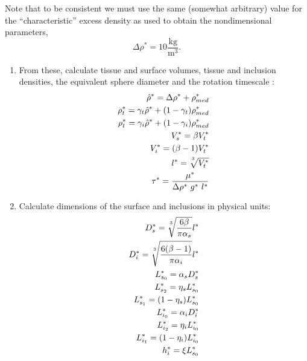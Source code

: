 \documentclass[10pt,a4paper]{article}
\def\non{\nonumber}
\def\l{\mathit{l}}
\begin{document}
\color{red}
Note that to be consistent we must use the same (somewhat arbitrary) value for the ``characteristic'' excess density as used to obtain the nondimensional parameters,
\begin{equation}
	\Delta \rho^* = 10 \frac{\mathrm{kg}}{\mathrm{m^3}}.
\end{equation}
\color{black}


\begin{enumerate}
	\item From these, calculate tissue and surface volumes, tissue and inclusion densities, the equivalent sphere diameter and the rotation timescale :
\begin{eqnarray}\label{nd2dpars3}
	\hat{\rho}^* = \Delta \rho^* + \rho^*_{med} \non \\
	\rho^*_t = \gamma_t \hat{\rho}^* + (1-\gamma_t) \rho^*_{med} \non \\
	\rho^*_t = \gamma_i \hat{\rho}^* + (1-\gamma_i) \rho^*_{med} \non \\
	V_s^* = \beta V_t^* \non \\
	V_i^* = (\beta-1) V_t^* \non \\
	l^* = \sqrt[\uproot{5}3]{V_t^*} \non \\
	\tau^* = \frac{\mu^*}{\Delta \rho^* ~ g^* ~ l^*}
\end{eqnarray}
\item Calculate dimensions of the surface and inclusions in physical units:
\begin{eqnarray}\label{nd2dpars4}
	D_s^* = \sqrt[\uproot{5}3]{\frac{6 \beta}{\pi \alpha_s}} l^* \non \\
	D^*_i = \sqrt[\uproot{5}3]{\frac{6 (\beta-1)}{\pi \alpha_i}} l^* \non \\
	L^*_{s_0} = \alpha_s D^*_s \non \\
	L^*_{s_2} = \eta_s L^*_{s_0} \non \\
	L^*_{s_1} = (1-\eta_s) L^*_{s_0} \non \\
	L^*_{i_0} = \alpha_i D^*_i \non \\
	L^*_{i_2} = \eta_i L^*_{i_0} \non \\
	L^*_{i_1} = (1-\eta_i) L^*_{i_0} \non \\
	h^*_i = \xi L^*_{s_0}  \non \\

\end{eqnarray}
\end{enumerate}
\end{document}
